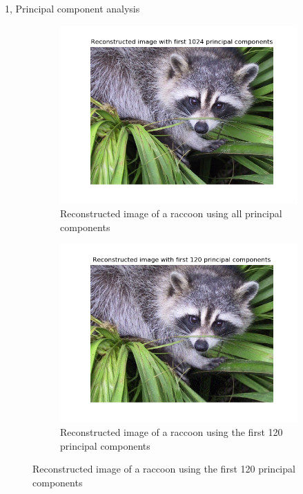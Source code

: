 \documentclass[10pt,a4paper]{article}
\begin{document}
\begin{task}{1, Principal component analysis}
\begin{figure}[H]
\centering
\begin{subfigure}[b]{0.475\textwidth}
\centering
\includegraphics[width=\textwidth]{../plots/task1/task1_2_firstall.png}
\caption[]
{{\small Reconstructed image of a raccoon using all principal components}}
\label{fig:task1_part2_all}
\end{subfigure}
\hfill
\begin{subfigure}[b]{0.475\textwidth}
\centering
\includegraphics[width=\textwidth]{../plots/task1/task1_2_first120.png}
\caption[]
{{\small Reconstructed image of a raccoon using the first 120 principal components}}
\label{fig:task1_part2_120}
\end{subfigure}

\end{figure}
\end{task}
\end{document}
